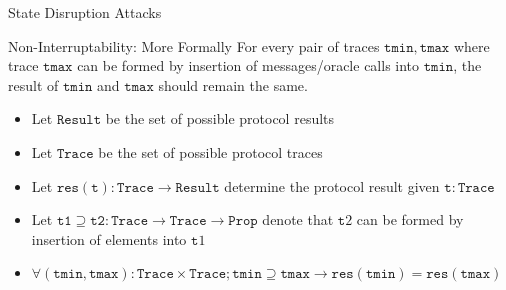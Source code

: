 
\begin{frame}{State Disruption Attacks}
\end{frame}

\begin{frame}{Non-Interruptability: More Formally}
    For every pair of traces $\mathtt{tmin}, \mathtt{tmax}$ where trace $\mathtt{tmax}$ can be formed by
    insertion of messages/oracle calls into $\mathtt{tmin}$, the result of $\mathtt{tmin}$ and $\mathtt{tmax}$
    should remain the same.

    \begin{itemize}
      \item Let $\mathtt{Result}$ be the set of possible protocol results
      \item Let $\mathtt{Trace}$ be the set of possible protocol traces
      \item Let $\mathtt{res}(\mathtt{t}) : \mathtt{Trace} \to \mathtt{Result}$ determine the protocol result given $\mathtt{t} : \mathtt{Trace}$
      \item Let $\mathtt{t1} \supseteq \mathtt{t2} : \mathtt{Trace} \to \mathtt{Trace} \to \mathtt{Prop}$ denote that $\mathtt{t}2$ can be formed by insertion of elements into $\mathtt{t}1$
      \item $\forall (\mathtt{tmin}, \mathtt{tmax}) : \mathtt{Trace} \times \mathtt{Trace}; \mathtt{tmin} \supseteq \mathtt{tmax} \to \mathtt{res}(\mathtt{tmin}) = \mathtt{res}(\mathtt{tmax})$
    \end{itemize}
\end{frame}

